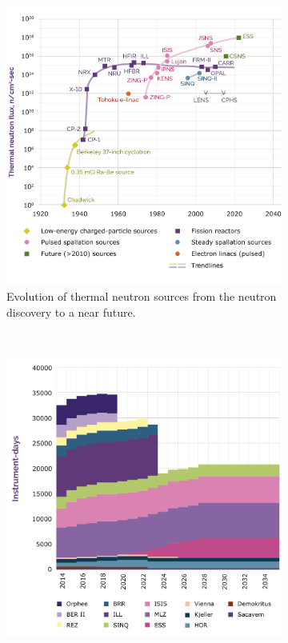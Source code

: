 \begin{figure}[!ht]
	\begin{subfigure}[t]{0.5\textwidth}
		\includegraphics[width=\textwidth]{01_Introduction/figures/fig000_NeutronSources_a}
		\caption{Evolution of thermal neutron sources from the neutron discovery to a near future.}
		\label{}
	\end{subfigure}
	~
	\begin{subfigure}[t]{0.5\textwidth}
		\includegraphics[width=\textwidth]{01_Introduction/figures/fig000_NeutronSources_b}

\end{subfigure}
\end{figure}
